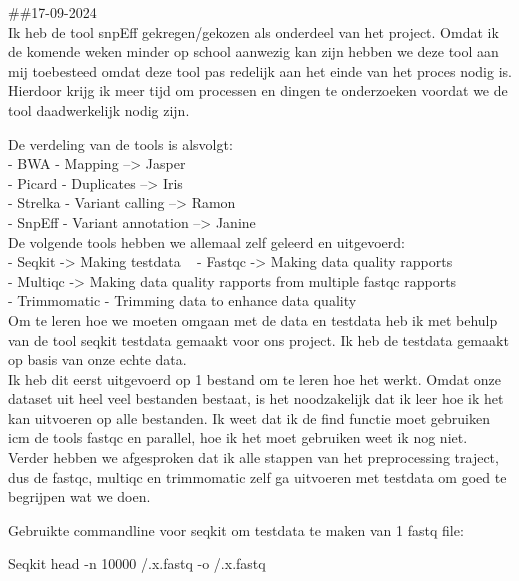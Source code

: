 \documentclass[
]{article}
\newenvironment{Shaded}{\begin{snugshade}}{\end{snugshade}}
\newcommand{\AttributeTok}[1]{\textcolor[rgb]{0.13,0.29,0.53}{#1}}
\newcommand{\ExtensionTok}[1]{#1}
\newcommand{\NormalTok}[1]{#1}
\begin{document}
\#\#17-09-2024\\
Ik heb de tool snpEff gekregen/gekozen als onderdeel van het project.
Omdat ik de komende weken minder op school aanwezig kan zijn hebben we
deze tool aan mij toebesteed omdat deze tool pas redelijk aan het einde
van het proces nodig is. Hierdoor krijg ik meer tijd om processen en
dingen te onderzoeken voordat we de tool daadwerkelijk nodig zijn.

De verdeling van de tools is alsvolgt:\\
- BWA - Mapping --\textgreater{} Jasper\\
- Picard - Duplicates --\textgreater{} Iris\\
- Strelka - Variant calling --\textgreater{} Ramon\\
- SnpEff - Variant annotation --\textgreater{} Janine\\

De volgende tools hebben we allemaal zelf geleerd en uitgevoerd:\\
- Seqkit -\textgreater{} Making testdata ~ - Fastqc -\textgreater{}
Making data quality rapports\\
- Multiqc -\textgreater{} Making data quality rapports from multiple
fastqc rapports\\
- Trimmomatic - Trimming data to enhance data quality\\

Om te leren hoe we moeten omgaan met de data en testdata heb ik met
behulp van de tool seqkit testdata gemaakt voor ons project. Ik heb de
testdata gemaakt op basis van onze echte data.\\
Ik heb dit eerst uitgevoerd op 1 bestand om te leren hoe het werkt.
Omdat onze dataset uit heel veel bestanden bestaat, is het noodzakelijk
dat ik leer hoe ik het kan uitvoeren op alle bestanden. Ik weet dat ik
de find functie moet gebruiken icm de tools fastqc en parallel, hoe ik
het moet gebruiken weet ik nog niet. Verder hebben we afgesproken dat ik
alle stappen van het preprocessing traject, dus de fastqc, multiqc en
trimmomatic zelf ga uitvoeren met testdata om goed te begrijpen wat we
doen.

Gebruikte commandline voor seqkit om testdata te maken van 1 fastq file:

\begin{Shaded}
\begin{Highlighting}[]
\ExtensionTok{Seqkit}\NormalTok{ head }\AttributeTok{{-}n}\NormalTok{ 10000 /.x.fastq }\AttributeTok{{-}o}\NormalTok{ /.x.fastq}
\end{Highlighting}
\end{Shaded}
\end{document}
